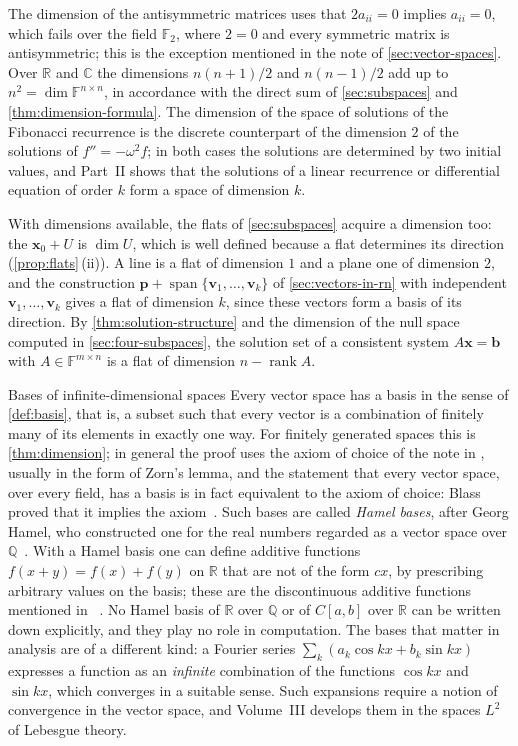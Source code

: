 The dimension of the antisymmetric matrices uses that $2a_{ii}=0$ implies $a_{ii}=0$, which fails over the field $\mathbb F_2$, where $2=0$ and every symmetric matrix is antisymmetric; this is the exception mentioned in the note of \cref{sec:vector-spaces}. Over $\mathbb R$ and $\mathbb C$ the dimensions $n(n+1)/2$ and $n(n-1)/2$ add up to $n^2=\dim\mathbb F^{n\times n}$, in accordance with the direct sum of \cref{sec:subspaces} and \cref{thm:dimension-formula}. The dimension of the space of solutions of the Fibonacci recurrence is the discrete counterpart of the dimension $2$ of the solutions of $f''=-\omega^2f$; in both cases the solutions are determined by two initial values, and Part~II shows that the solutions of a linear recurrence or differential equation of order $k$ form a space of dimension $k$.

With dimensions available, the flats of \cref{sec:subspaces} acquire a dimension too: the  $\mathbf x_0+U$ is $\dim U$, which is well defined because a flat determines its direction (\cref{prop:flats}\,(ii)). A line is a flat of dimension $1$ and a plane one of dimension $2$, and the construction $\mathbf p+\operatorname{span}\{\mathbf v_1,\ldots,\mathbf v_k\}$ of \cref{sec:vectors-in-rn} with independent $\mathbf v_1,\ldots,\mathbf v_k$ gives a flat of dimension $k$, since these vectors form a basis of its direction. By \cref{thm:solution-structure} and the dimension of the null space computed in \cref{sec:four-subspaces}, the solution set of a consistent system $A\mathbf x=\mathbf b$ with $A\in\mathbb F^{m\times n}$ is a flat of dimension $n-\operatorname{rank}A$.

\begin{note}{Bases of infinite-dimensional spaces}
Every vector space has a basis in the sense of \cref{def:basis}, that is, a subset such that every vector is a combination of finitely many of its elements in exactly one way. For finitely generated spaces this is \cref{thm:dimension}; in general the proof uses the axiom of choice of the note in , usually in the form of Zorn's lemma, and the statement that every vector space, over every field, has a basis is in fact equivalent to the axiom of choice: Blass proved that it implies the axiom~\cite{blass1984}. Such bases are called \emph{Hamel bases}, after Georg Hamel, who constructed one for the real numbers regarded as a vector space over $\mathbb Q$~\cite{hamel1905}. With a Hamel basis one can define additive functions $f(x+y)=f(x)+f(y)$ on $\mathbb R$ that are not of the form $cx$, by prescribing arbitrary values on the basis; these are the discontinuous additive functions mentioned in ~\cite{aczel1966}. No Hamel basis of $\mathbb R$ over $\mathbb Q$ or of $C[a,b]$ over $\mathbb R$ can be written down explicitly, and they play no role in computation. The bases that matter in analysis are of a different kind: a Fourier series $\sum_k(a_k\cos kx+b_k\sin kx)$ expresses a function as an \emph{infinite} combination of the functions $\cos kx$ and $\sin kx$, which converges in a suitable sense. Such expansions require a notion of convergence in the vector space, and Volume~III develops them in the spaces $L^2$ of Lebesgue theory.
\end{note}

